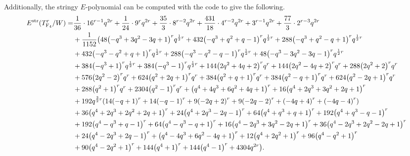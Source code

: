 \documentclass[11pt,english]{amsart}
\numberwithin{equation}{section}
\numberwithin{figure}{section}
\theoremstyle{plain}
\theoremstyle{plain}
\theoremstyle{definition}
\theoremstyle{remark}
\newcommand{\F}{\operatorname{F}}
\newcommand{\str}{\textup{str}}
\begin{document}
Additionally, the stringy $E$-polynomial can be computed with the code \cite{code_repository} to give the following.
{\tiny
\begin{align*}
E^{\str}(T_{\F_4}^r/W) =& \frac{1}{36} \cdot 16^{r - 1}  q^{2  r} + \frac{1}{24} \cdot 9^{r}  q^{2  r} + \frac{35}{3} \cdot 8^{r - 2}  q^{2  r} + \frac{431}{18} \cdot 4^{r - 2}  q^{2  r} + 3^{r - 1}  q^{2  r}  + \frac{77}{3} \cdot 2^{r - 3}  q^{2  r} \\
& + \frac{1}{1152}  \big(48  {\left(-q^{3} + 3  q^{2} - 3  q + 1\right)}^{r} q^{\frac{1}{2}  r} + 432  {\left(-q^{3} + q^{2} + q - 1\right)}^{r} q^{\frac{1}{2}  r} + 288  {\left(-q^{3} + q^{2} - q + 1\right)}^{r} q^{\frac{1}{2}  r} \\
& + 432  {\left(-q^{3} - q^{2} + q + 1\right)}^{r} q^{\frac{1}{2}  r} + 288  {\left(-q^{3} - q^{2} - q - 1\right)}^{r} q^{\frac{1}{2}  r} + 48  {\left(-q^{3} - 3  q^{2} - 3  q - 1\right)}^{r} q^{\frac{1}{2}  r} \\
& + 384  {\left(-q^{3} + 1\right)}^{r} q^{\frac{1}{2}  r} + 384  {\left(-q^{3} - 1\right)}^{r} q^{\frac{1}{2}  r} + 144  {\left(2  q^{2} + 4  q + 2\right)}^{r} q^{r} + 144  {\left(2  q^{2} - 4  q + 2\right)}^{r} q^{r} + 288  {\left(2  q^{2} + 2\right)}^{r} q^{r} \\
& + 576  {\left(2  q^{2} - 2\right)}^{r} q^{r} + 624  {\left(q^{2} + 2  q + 1\right)}^{r} q^{r} + 384  {\left(q^{2} + q + 1\right)}^{r} q^{r} + 384  {\left(q^{2} - q + 1\right)}^{r} q^{r} + 624  {\left(q^{2} - 2  q + 1\right)}^{r} q^{r} \\
& + 288  {\left(q^{2} + 1\right)}^{r} q^{r} + 2304  {\left(q^{2} - 1\right)}^{r} q^{r} + {\left(q^{4} + 4  q^{3} + 6  q^{2} + 4  q + 1\right)}^{r} + 16  {\left(q^{4} + 2  q^{3} + 3  q^{2} + 2  q + 1\right)}^{r} \\
& + 192  q^{\frac{3}{2}  r} {\left(14  {\left(-q + 1\right)}^{r} + 14  {\left(-q - 1\right)}^{r} + 9  {\left(-2  q + 2\right)}^{r} + 9  {\left(-2  q - 2\right)}^{r} + {\left(-4  q + 4\right)}^{r} + {\left(-4  q - 4\right)}^{r}\right)} \\
& + 36  {\left(q^{4} + 2  q^{3} + 2  q^{2} + 2  q + 1\right)}^{r} + 24  {\left(q^{4} + 2  q^{3} - 2  q - 1\right)}^{r} + 64  {\left(q^{4} + q^{3} + q + 1\right)}^{r} + 192  {\left(q^{4} + q^{3} - q - 1\right)}^{r} \\
& + 192  {\left(q^{4} - q^{3} + q - 1\right)}^{r} + 64  {\left(q^{4} - q^{3} - q + 1\right)}^{r} + 16  {\left(q^{4} - 2  q^{3} + 3  q^{2} - 2  q + 1\right)}^{r} + 36  {\left(q^{4} - 2  q^{3} + 2  q^{2} - 2  q + 1\right)}^{r} \\
& + 24  {\left(q^{4} - 2  q^{3} + 2  q - 1\right)}^{r} + {\left(q^{4} - 4  q^{3} + 6  q^{2} - 4  q + 1\right)}^{r} + 12  {\left(q^{4} + 2  q^{2} + 1\right)}^{r} + 96  {\left(q^{4} - q^{2} + 1\right)}^{r} \\
& + 90  {\left(q^{4} - 2  q^{2} + 1\right)}^{r} + 144  {\left(q^{4} + 1\right)}^{r} + 144  {\left(q^{4} - 1\right)}^{r} + 4304  q^{2  r}\big) .
\end{align*}}
\end{document}
